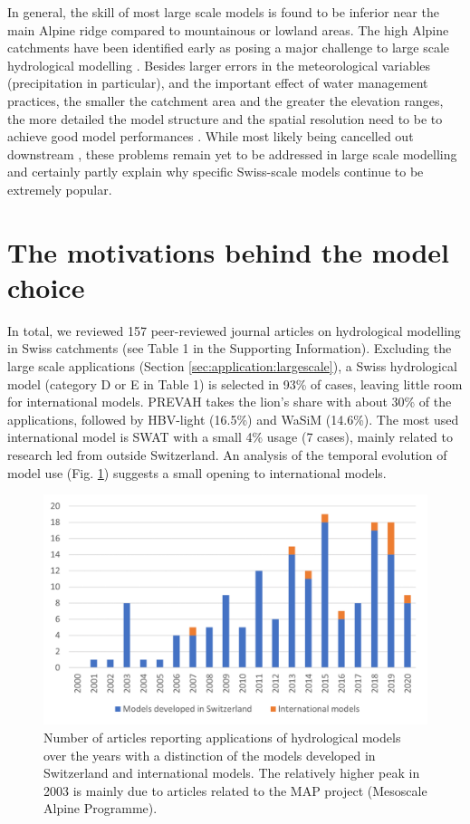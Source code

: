 \documentclass[10pt,a4paper]{article}
\begin{document}
In general, the skill of most large scale models is found to be inferior near the main Alpine ridge compared to mountainous or lowland areas. The high Alpine catchments have been identified early as posing a major challenge to large scale hydrological modelling \citep{Kleinn2005}.  Besides larger errors in the meteorological variables (precipitation in particular), and the important effect of water management practices, the smaller the catchment area and the greater the elevation ranges, the more detailed the model structure and the spatial resolution need to be to achieve good model performances \citep{Gurtz2003}. While most likely being cancelled out downstream \citep{Kleinn2005}, these problems remain yet to be addressed in large scale modelling and certainly partly explain why specific Swiss-scale models continue to be extremely popular. 


\section{The motivations behind the model choice}
\label{sec:motivations}

In total, we reviewed 157 peer-reviewed journal articles on hydrological modelling in Swiss catchments (see Table 1 in the Supporting Information). Excluding the large scale applications (Section \ref{sec:application:largescale}), a Swiss hydrological model (category D or E in Table 1) is selected in 93\% of cases, leaving little room for international models. PREVAH takes the lion's share with about 30\% of the applications, followed by HBV-light (16.5\%) and WaSiM (14.6\%). The most used international model is SWAT with a small 4\% usage (7 cases), mainly related to research led from outside Switzerland. An analysis of the temporal evolution of model use (Fig. \ref{fig:bars}) suggests a small opening to international models. 

\begin{figure}[htb]
	\begin{center}
		\includegraphics[width=0.70\columnwidth]{figures/histogram.png}
		\caption{{Number of articles reporting applications of hydrological models over the years with a distinction of the models developed in Switzerland and international models. The relatively higher peak in 2003 is mainly due to articles related to the MAP project (Mesoscale Alpine Programme).
		{\label{fig:bars}}
		}}
	\end{center}
\end{figure}
\end{document}
